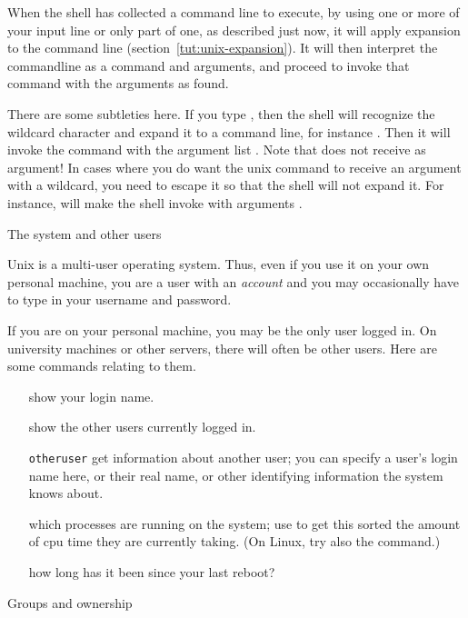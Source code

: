 When the shell has collected a command line to execute, by using one or
more of your input line or only part of one, as described just now, it
will apply expansion to the command line
(section~\ref{tut:unix-expansion}). It will then interpret the
commandline as a command and arguments, and proceed to invoke that
command with the arguments as found.

There are some subtleties here. If you type , then the shell
will recognize the wildcard character and expand it to a command line,
for instance . Then it will invoke the 
command with the argument list . Note that  does
not receive  as argument! In cases where you do want the unix
command to receive an argument with a wildcard, you need to escape it
so that the shell will not expand it. For instance,  will make the shell invoke  with arguments .

 {The system and other users}
\label{sec:users}

Unix is a multi-user operating system. Thus, even if you use it
on your own personal machine, you are a user with an \emph{account}
and you may occasionally
have to type in your username and password.

If you are on your personal machine, you may be the only user logged
in. On university machines or other servers, there will often be other
users. Here are some commands relating to them.

\begin{itemize}
\item [\indexunix{whoami}] show your login name.
\item [\indexunix{who}] show the other users currently logged in.
\item [\indexunix{finger} {\tt otheruser}] get information about another user;
  you can specify a user's login name here, or their real name,
  or other identifying information the system knows about.
\item [\indexunix{top}] which processes are running on the system; use
   to get this sorted the amount of cpu time they are
  currently taking. (On Linux, try also the  command.)
\item [\indexunix{uptime}] how long has it been since your last reboot?
\end{itemize}

 {Groups and ownership}
\label{sec:tut-group-own}

